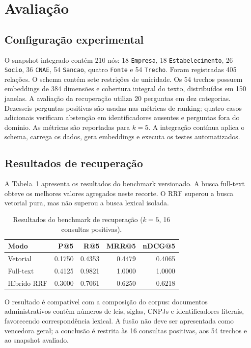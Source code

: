 \documentclass[conference]{IEEEtran}
\begin{document}
\section{Avaliação}
\subsection{Configuração experimental}
O snapshot integrado contém 210 nós: 18 \texttt{Empresa}, 18 \texttt{Estabelecimento}, 26 \texttt{Socio}, 36 \texttt{CNAE}, 54 \texttt{Sancao}, quatro \texttt{Fonte} e 54 \texttt{Trecho}. Foram registradas 405 relações. O schema contém sete restrições de unicidade. Os 54 trechos possuem embeddings de 384 dimensões e cobertura integral do texto, distribuídos em 150 janelas.
A avaliação da recuperação utiliza 20 perguntas em dez categorias. Dezesseis perguntas positivas são usadas nas métricas de ranking; quatro casos adicionais verificam abstenção em identificadores ausentes e perguntas fora do domínio. As métricas são reportadas para $k=5$. A integração contínua aplica o schema, carrega os dados, gera embeddings e executa os testes automatizados.
\subsection{Resultados de recuperação}
A Tabela~\ref{tab:retrieval} apresenta os resultados do benchmark versionado. A busca full-text obteve os melhores valores agregados neste recorte. O RRF superou a busca vetorial pura, mas não superou a busca lexical isolada.
\begin{table}[ht]
\centering
\caption{Resultados do benchmark de recuperação ($k=5$, 16 consultas positivas).}
\label{tab:retrieval}
\begin{tabular}{lrrrr}
\toprule
Modo & P@5 & R@5 & MRR@5 & nDCG@5 \\
\midrule
Vetorial & 0.1750 & 0.4353 & 0.4479 & 0.4065 \\
Full-text & 0.4125 & 0.9821 & 1.0000 & 1.0000 \\
Híbrido RRF & 0.3000 & 0.7061 & 0.6250 & 0.6218 \\
\bottomrule
\end{tabular}
\end{table}
O resultado é compatível com a composição do corpus: documentos administrativos contêm números de leis, siglas, CNPJs e identificadores literais, favorecendo correspondência lexical. A fusão não deve ser apresentada como vencedora geral; a conclusão é restrita às 16 consultas positivas, aos 54 trechos e ao snapshot avaliado.
\end{document}

